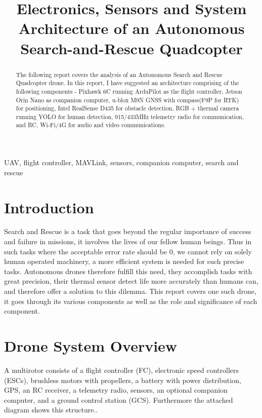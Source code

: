 \documentclass[conference]{IEEEtran}
\begin{document}
\title{Electronics, Sensors and System Architecture of an Autonomous Search-and-Rescue Quadcopter}
\author{
}
\maketitle

\begin{abstract}

The following report covers the analysis of an Autonomous Search and Rescue Quadcopter drone. In this report, I have suggested an architecture comprising of the following components - Pixhawk 6C running ArduPilot as the flight controller, Jetson Orin Nano as companion computer, u-blox M9N GNSS with compass(F9P for RTK) for positioning, Intel RealSense D435 for obstacle detection, RGB + thermal camera running YOLO for human detection, 915/433MHz telemetry radio for communication, and RC, Wi-Fi/4G for audio and video communications. 
\end{abstract}

\begin{IEEEkeywords}
UAV, flight controller, MAVLink, sensors, companion computer, search and rescue
\end{IEEEkeywords}

\section{Introduction}
Search and Rescue is a task that goes beyond the regular importance of success and failure in missions, it involves the lives of our fellow human beings. Thus in such tasks where the acceptable error rate should be 0, we cannot rely on solely human operated machinery, a more efficient system is needed for such precise tasks. Autonomous drones therefore fulfill this need, they accomplish tasks with great precision, their thermal sensor detect life more accurately than humans can, and therefore offer a solution to this dilemma. This report covers one such drone, it goes through its various components as well as the role and significance of each component.


\section{Drone System Overview}
A multirotor consists of a flight controller (FC), electronic speed controllers (ESCs), brushless motors with propellers, a battery with power distribution, GPS, an RC receiver, a telemetry radio, sensors, an optional companion computer, and a ground control station (GCS). Furthermore the attached diagram shows this structure.\cite{ardupilot}.
\end{document}
